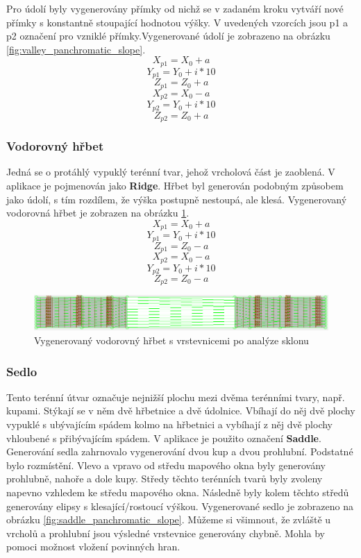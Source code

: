 \documentclass[a4paper,11pt,twoside]{article}
\begin{document}
\indent Pro údolí byly vygenerovány přímky od nichž se v zadaném kroku vytváří nové přímky s konstantně stoupající hodnotou výšky. V uvedených vzorcích jsou p1 a p2 označení pro vzniklé přímky.Vygenerované údolí je zobrazeno na obrázku \ref{fig:valley_panchromatic_slope}.
$$
X_{p1} = X_0 + a
$$
$$
Y_{p1} = Y_0 + i * 10
$$
$$
Z_{p1} = Z_0 + a
$$
$$
X_{p2} = X_0 - a
$$
$$
Y_{p2} = Y_0 + i * 10
$$
$$
Z_{p2} = Z_0 + a
$$

\subsubsection{Vodorovný hřbet}
Jedná se o protáhlý vypuklý terénní tvar, jehož vrcholová část je zaoblená. V aplikace je pojmenován jako \textbf{Ridge}. Hřbet byl generován podobným způsobem jako údolí, s tím rozdílem, že výška postupně nestoupá, ale klesá.  Vygenerovaný vodorovná hřbet je zobrazen na obrázku \ref{fig:ridge_panchromatic_slope}.
$$
X_{p1} = X_0 + a
$$
$$
Y_{p1} = Y_0 + i * 10
$$
$$
Z_{p1} = Z_0 - a
$$
$$
X_{p2} = X_0 - a
$$
$$
Y_{p2} = Y_0 + i * 10
$$
$$
Z_{p2} = Z_0 - a
$$

\vspace{0.2cm}
\begin{figure}[hbt!] 
\begin{center}
\includegraphics[width=12cm]{pictures/ridge_panchromatic_slope.PNG} 
\caption[Vygenerovaný vodorovný hřbet s vrstevnicemi po analýze sklonu]{Vygenerovaný vodorovný hřbet s vrstevnicemi po analýze sklonu}
\label{fig:ridge_panchromatic_slope}
\end{center}
\end{figure}

\subsubsection{Sedlo}
Tento terénní útvar označuje nejnižší plochu mezi dvěma terénními tvary, např. kupami. Stýkají se v něm dvě hřbetnice a dvě údolnice. Vbíhají do něj dvě plochy vypuklé s ubývajícím spádem kolmo na hřbetnici a vybíhají z něj dvě plochy vhloubené s přibývajícím spádem. V aplikace je použito označení \textbf{Saddle}. \\
\indent Generování sedla zahrnovalo vygenerování dvou kup a dvou prohlubní. Podstatné bylo rozmístění. Vlevo a vpravo od středu mapového okna byly generovány prohlubně, nahoře a dole kupy. Středy těchto terénních tvarů byly zvoleny napevno vzhledem ke středu mapového okna. Následně byly kolem těchto středů generovány elipsy s klesající/rostoucí výškou. Vygenerované sedlo je zobrazeno na obrázku \ref{fig:saddle_panchromatic_slope}. Můžeme si všimnout, že zvláště u vrcholů a prohlubní jsou výsledné vrstevnice generovány chybně. Mohla by pomoci možnost vložení povinných hran.\\
\end{document}

